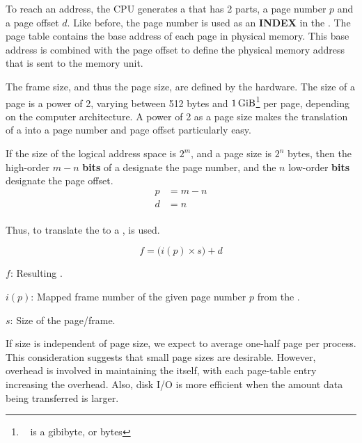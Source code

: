To reach an address, the CPU generates a  that has 2 parts, a page number $p$ and a page offset $d$.
Like before, the page number is used as an \textbf{INDEX} in the .
The page table contains the base address of each page in physical memory.
This base address is combined with the page offset to define the physical memory address that is sent to the memory unit.

The frame size, and thus the page size, are defined by the hardware.
The size of a page is a power of 2, varying between 512 bytes and $\SI{1}{\gibi\byte}$\footnote{\si{\gibi\byte} is a gibibyte, or \si[prefixes-as-symbols=false]{\gibi} bytes} per page, depending on the computer architecture.
A power of 2 as a page size makes the translation of a  into a page number and page offset particularly easy.

If the size of the logical address space is $2^{m}$, and a page size is $2^{n}$ bytes, then the high-order $m-n$ \textbf{bits} of a  designate the page number, and the $n$ low-order \textbf{bits} designate the page offset.
\begin{equation}\label{eq:Page_Table_Calculations}
  \begin{aligned}
    p &= m-n \\
    d &= n \\
  \end{aligned}
\end{equation}

Thus, to translate the  to a ,  is used.

\begin{equation}\label{eq:Paging_Logical_Physical_Address_Conversion}
  f = \bigl( i(p) \times s \bigr) + d
\end{equation}
\begin{description}[noitemsep]
\item $f$: Resulting .
\item $i(p)$: Mapped frame number of the given page number $p$ from the .
\item $s$: Size of the page/frame.
\end{description}

If  size is independent of page size, we expect  to average one-half page per process.
This consideration suggests that small page sizes are desirable.
However, overhead is involved in maintaining the  itself, with each page-table entry increasing the overhead.
Also, disk I/O is more efficient when the amount data being transferred is larger.

